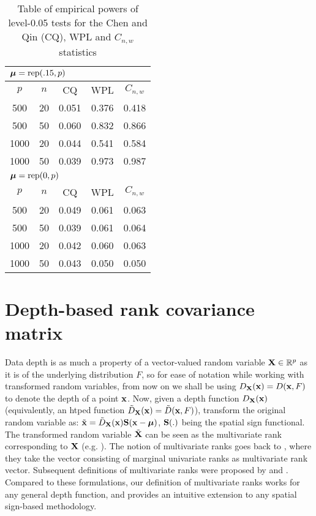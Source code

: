 \documentclass[fleqn,11pt]{article}
\begin{document}
\begin{table}
\centering
    \begin{tabular}{cc|ccc}\hline
\multicolumn{5}{l}{${\boldsymbol{\mu}} = \text{rep}(.15,p)$}\\\hline 
 $p$  & $n$    & CQ   & WPL  & $C_{n,w}$ \\\hline 
  500 & 20 & 0.051 & 0.376 & 0.418 \\
  500 & 50 & 0.060 & 0.832 & 0.866 \\
 1000 & 20 & 0.044 & 0.541 & 0.584 \\
 1000 & 50 & 0.039 & 0.973 & 0.987 \\\hline
\multicolumn{5}{l}{${\boldsymbol{\mu}} = \text{rep}(0,p)$}\\\hline
 $p$  & $n$    & CQ   & WPL  & $C_{n,w}$ \\\hline 
  500 & 20 & 0.049 & 0.061 & 0.063 \\
  500 & 50 & 0.039 & 0.061 & 0.064 \\
 1000 & 20 & 0.042 & 0.060 & 0.063 \\
 1000 & 50 & 0.043 & 0.050 & 0.050 \\\hline
    \end{tabular}
    \caption{Table of empirical powers of level-0.05 tests for the Chen and Qin (CQ), WPL and $C_{n,w}$ statistics}
    \label{table:AREtablehd}
\end{table}

\section{Depth-based rank covariance matrix} \label{section:dcmSection}

Data depth is as much a property of a vector-valued random variable ${\mathbf{X}} \in \mathbb{R}^p$ as it is of the underlying distribution $F$, so for ease of notation while working with transformed random variables, from now on we shall be using $D_{\mathbf{X}}({\bf{x}}) = D({\bf{x}}, F)$ to denote the depth of a point ${\bf{x}}$. Now, given a depth function $D_{{\mathbf{X}}}({\bf{x}})$ (equivalently, an htped function $\tilde D_{\mathbf{X}}({\bf{x}}) = \tilde D({\bf{x}}, F)$), transform the original random variable as: $\tilde {{\bf{x}}} = \tilde D_{\mathbf{X}}({\bf{x}}) {\mathbf{S}}({\bf{x}} - {\boldsymbol{\mu}})$, ${\mathbf{S}}(.)$ being the spatial sign functional. The transformed random variable $\tilde {{\mathbf{X}}}$ can be seen as the multivariate rank corresponding to ${\mathbf{X}}$ (e.g. \cite{serfling2006}). The notion of multivariate ranks goes back to \cite{PuriSenBook}, where they take the vector consisting of marginal univariate ranks as multivariate rank vector. Subsequent definitions of multivariate ranks were proposed by \cite{MottonenOja95,HallinPaindaveine02} and \cite{Chernozhukov14}. Compared to these formulations, our definition of multivariate ranks works for any general depth function, and provides an intuitive extension to any spatial sign-based methodology.
\end{document}

